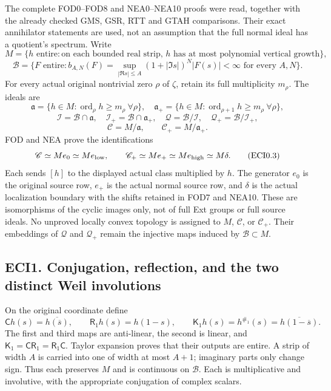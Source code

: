 The complete FOD0--FOD8 and NEA0--NEA10 proofs were read, together with
the already checked GMS, GSR, RTT and GTAH comparisons. Their exact
annihilator statements are used, not an assumption that the full normal
ideal has a quotient's spectrum. Write \[
M=\{h\text{ entire}:\text{on each bounded real strip, }h
\text{ has at most polynomial vertical growth}\},
\] \[
\mathcal B=\{F\text{ entire}:b_{A,N}(F)=
\sup_{|\Re s|\le A}(1+|\Im s|)^N|F(s)|<\infty
\text{ for every }A,N\}.
\tag{ECI0.1}
\] For every actual original nontrivial zero \(\rho\) of \(\zeta\),
retain its full multiplicity \(m_\rho\). The ideals are \[
\mathfrak a=\{h\in M:\operatorname{ord}_\rho h\ge m_\rho\ \forall\rho\},
\quad
\mathfrak a_+=\{h\in M:\operatorname{ord}_{\rho+1}h\ge m_\rho\ \forall\rho\},
\] \[
\mathcal I=\mathcal B\cap\mathfrak a,
\quad\mathcal I_+=\mathcal B\cap\mathfrak a_+,
\quad\mathcal Q=\mathcal B/\mathcal I,
\quad\mathcal Q_+=\mathcal B/\mathcal I_+,
\] \[
\mathscr C=M/\mathfrak a,
\qquad\mathscr C_+=M/\mathfrak a_+.
\tag{ECI0.2}
\] FOD and NEA prove the identifications \[
\mathscr C\simeq M e_0\simeq M e_{\rm low},\qquad
\mathscr C_+\simeq M e_+\simeq M e_{\rm high}\simeq M\delta.
\tag{ECI0.3}
\] Each sends \([h]\) to the displayed actual class multiplied by \(h\).
The generator \(e_0\) is the original source row, \(e_+\) is the actual
normal source row, and \(\delta\) is the actual localization boundary
with the shifts retained in FOD7 and NEA10. These are isomorphisms of
the cyclic images only, not of full Ext groups or full source ideals. No
unproved locally convex topology is assigned to \(M\), \(\mathscr C\),
or \(\mathscr C_+\). Their embeddings of \(\mathcal Q\) and
\(\mathcal Q_+\) remain the injective maps induced by
\(\mathcal B\subset M\).

\subsection{ECI1. Conjugation, reflection, and the two distinct Weil
involutions}\label{eci1.-conjugation-reflection-and-the-two-distinct-weil-involutions}

On the original coordinate define \[
\mathsf C h(s)=\overline{h(\overline s)},\qquad
\mathsf R_1h(s)=h(1-s),\qquad
\mathsf K_1h(s)=h^{\#_1}(s)=\overline{h(1-\overline s)}.
\tag{ECI1.1}
\] The first and third maps are anti-linear, the second is linear, and
\(\mathsf K_1=\mathsf C\mathsf R_1=\mathsf R_1\mathsf C\). Taylor
expansion proves that their outputs are entire. A strip of width \(A\)
is carried into one of width at most \(A+1\); imaginary parts only
change sign. Thus each preserves \(M\) and is continuous on
\(\mathcal B\). Each is multiplicative and involutive, with the
appropriate conjugation of complex scalars.


